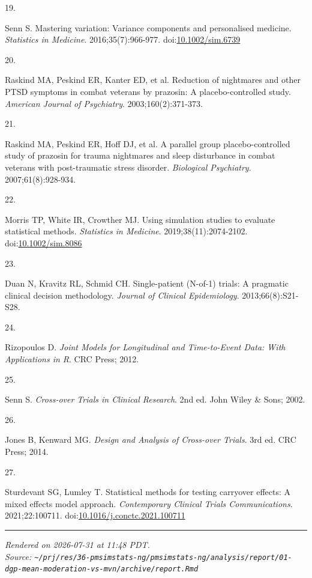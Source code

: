 \documentclass[
  11pt,
]{article}
\newlength{\cslhangindent}
\newlength{\csllabelwidth}
\newenvironment{CSLReferences}[2] %
 {\begin{list}{}{%
  \setlength{\itemindent}{0pt}
  \setlength{\leftmargin}{0pt}
  \setlength{\parsep}{0pt}
  \ifodd #1
   \setlength{\leftmargin}{\cslhangindent}
   \setlength{\itemindent}{-1\cslhangindent}
  \fi
  \setlength{\itemsep}{#2\baselineskip}}}
 {\end{list}}
\newcommand{\CSLLeftMargin}[1]{\parbox[t]{\csllabelwidth}{\strut#1\strut}}
\newcommand{\CSLRightInline}[1]{\parbox[t]{\linewidth - \csllabelwidth}{\strut#1\strut}}
\begin{document}
\begin{CSLReferences}{0}{1}
\CSLLeftMargin{19. }%
\CSLRightInline{Senn S. Mastering variation: Variance components and
personalised medicine. \emph{Statistics in Medicine}.
2016;35(7):966-977.
doi:\href{https://doi.org/10.1002/sim.6739}{10.1002/sim.6739}}

\CSLLeftMargin{20. }%
\CSLRightInline{{Raskind MA, Peskind ER, Kanter ED, et al.} Reduction of
nightmares and other {PTSD} symptoms in combat veterans by prazosin: A
placebo-controlled study. \emph{American Journal of Psychiatry}.
2003;160(2):371-373.}

\CSLLeftMargin{21. }%
\CSLRightInline{{Raskind MA, Peskind ER, Hoff DJ, et al.} A parallel
group placebo-controlled study of prazosin for trauma nightmares and
sleep disturbance in combat veterans with post-traumatic stress
disorder. \emph{Biological Psychiatry}. 2007;61(8):928-934.}

\CSLLeftMargin{22. }%
\CSLRightInline{Morris TP, White IR, Crowther MJ. Using simulation
studies to evaluate statistical methods. \emph{Statistics in Medicine}.
2019;38(11):2074-2102.
doi:\href{https://doi.org/10.1002/sim.8086}{10.1002/sim.8086}}

\CSLLeftMargin{23. }%
\CSLRightInline{Duan N, Kravitz RL, Schmid CH. Single-patient ({N}-of-1)
trials: A pragmatic clinical decision methodology. \emph{Journal of
Clinical Epidemiology}. 2013;66(8):S21-S28.}

\CSLLeftMargin{24. }%
\CSLRightInline{Rizopoulos D. \emph{Joint Models for Longitudinal and
Time-to-Event Data: With Applications in {R}}. CRC Press; 2012.}

\CSLLeftMargin{25. }%
\CSLRightInline{Senn S. \emph{Cross-over Trials in Clinical Research}.
2nd ed. John Wiley \& Sons; 2002.}

\CSLLeftMargin{26. }%
\CSLRightInline{Jones B, Kenward MG. \emph{Design and Analysis of
Cross-over Trials}. 3rd ed. CRC Press; 2014.}

\CSLLeftMargin{27. }%
\CSLRightInline{Sturdevant SG, Lumley T. Statistical methods for testing
carryover effects: A mixed effects model approach. \emph{Contemporary
Clinical Trials Communications}. 2021;22:100711.
doi:\href{https://doi.org/10.1016/j.conctc.2021.100711}{10.1016/j.conctc.2021.100711}}

\end{CSLReferences}

\vfill

\begin{center}\rule{0.5\linewidth}{0.5pt}\end{center}

\emph{Rendered on 2026-07-31 at 11:48 PDT.}\\
\emph{Source:
\texttt{\textasciitilde{}/prj/res/36-pmsimstats-ng/pmsimstats-ng/analysis/report/01-dgp-mean-moderation-vs-mvn/archive/report.Rmd}}
\end{document}
